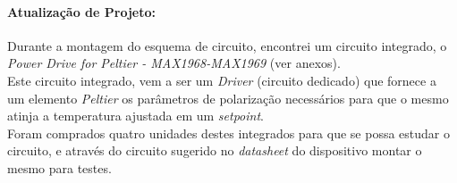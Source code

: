 \paragraph{Atualização de Projeto:}
Durante a montagem do esquema de circuito, encontrei um circuito integrado, o \emph{Power Drive for Peltier - MAX1968-MAX1969} (ver anexos).\\
Este circuito integrado, vem a ser um \emph{Driver} (circuito dedicado) que fornece a um elemento \emph{Peltier} os parâmetros de polarização necessários para que o mesmo atinja a temperatura ajustada em um \emph{setpoint}.\\

Foram comprados quatro unidades destes integrados para que se possa estudar o circuito, e através do circuito sugerido no \emph{datasheet} do dispositivo montar o mesmo para testes.\\

